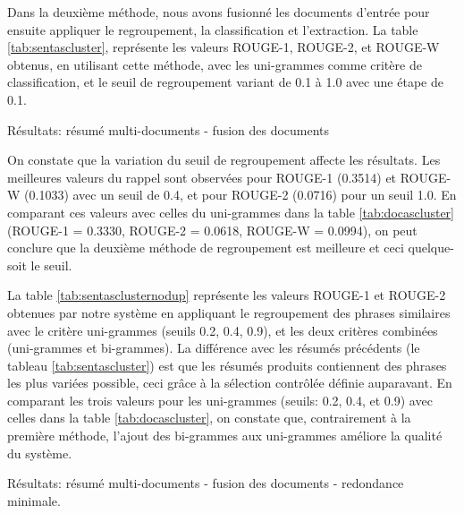 \documentclass[a4paper,12pt,oneside]{../use/ESIthesis}
\begin{document}
Dans la deuxième méthode, nous avons fusionné les documents d'entrée pour ensuite appliquer le regroupement, la classification et l'extraction. 
La table \ref{tab:sentascluster}, représente les valeurs ROUGE-1, ROUGE-2, et ROUGE-W obtenus, en utilisant cette méthode, avec les uni-grammes comme critère de classification, et le seuil de regroupement variant de 0.1 à 1.0 avec une étape de 0.1.
%
\begin{table}[!htbp]
\centering
\caption{Résultats: résumé multi-documents - fusion des documents}
\label{tab:sentascluster}
\end{table}
%
On constate que la variation du seuil de regroupement affecte les résultats. 
Les meilleures valeurs du rappel sont observées pour ROUGE-1 (0.3514) et ROUGE-W (0.1033) avec un seuil de 0.4, et pour ROUGE-2 (0.0716) pour un seuil 1.0. 
En comparant ces valeurs avec celles du uni-grammes dans la table \ref{tab:docascluster}  (ROUGE-1 = 0.3330, ROUGE-2 = 0.0618, ROUGE-W = 0.0994), on peut conclure que la deuxième méthode de regroupement est meilleure et ceci quelque-soit le seuil.

La table \ref{tab:sentasclusternodup} représente les valeurs ROUGE-1 et ROUGE-2 obtenues par notre système en appliquant le regroupement des phrases similaires avec le critère uni-grammes (seuils 0.2, 0.4, 0.9), et les deux critères combinées (uni-grammes et bi-grammes). 
La différence avec les résumés précédents (le tableau \ref{tab:sentascluster}) est que les résumés produits contiennent des phrases les plus variées possible, ceci grâce à la sélection contrôlée définie auparavant.
En comparant les trois valeurs pour les uni-grammes (seuils: 0.2, 0.4, et 0.9) avec celles dans la table \ref{tab:docascluster}, on constate que, contrairement à la première méthode, l'ajout des bi-grammes aux uni-grammes améliore la qualité du système.
%
\begin{table}[!htbp]
\centering
\caption{Résultats: résumé multi-documents - fusion des documents - redondance minimale.}
\label{tab:sentasclusternodup}
\end{table}
\end{document}

